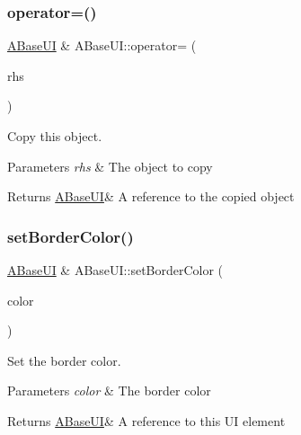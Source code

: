 \subsubsection{\texorpdfstring{operator=()}{operator=()}}
{\footnotesize\ttfamily \hyperlink{class_a_base_u_i}{A\+Base\+UI} \& A\+Base\+U\+I\+::operator= (\begin{DoxyParamCaption}\item[{\hyperlink{class_a_base_u_i}{A\+Base\+UI} const \&}]{rhs }\end{DoxyParamCaption})}



Copy this object. 


\begin{DoxyParams}{Parameters}
{\em rhs} & The object to copy \\
\hline
\end{DoxyParams}
\begin{DoxyReturn}{Returns}
\hyperlink{class_a_base_u_i}{A\+Base\+UI}\& A reference to the copied object 
\end{DoxyReturn}
\mbox{\label{class_a_base_u_i_a16d0d5da4f14b3e43a10f64cefbf8290}} 
\subsubsection{\texorpdfstring{set\+Border\+Color()}{setBorderColor()}}
{\footnotesize\ttfamily \hyperlink{class_a_base_u_i}{A\+Base\+UI} \& A\+Base\+U\+I\+::set\+Border\+Color (\begin{DoxyParamCaption}\item[{glm\+::vec4}]{color }\end{DoxyParamCaption})\hspace{0.3cm}{\ttfamily [virtual]}}



Set the border color. 


\begin{DoxyParams}{Parameters}
{\em color} & The border color \\
\hline
\end{DoxyParams}
\begin{DoxyReturn}{Returns}
\hyperlink{class_a_base_u_i}{A\+Base\+UI}\& A reference to this UI element 
\end{DoxyReturn}
\mbox{\label{class_a_base_u_i_a3028cb83474c9a384dac58d110aa196f}} 

